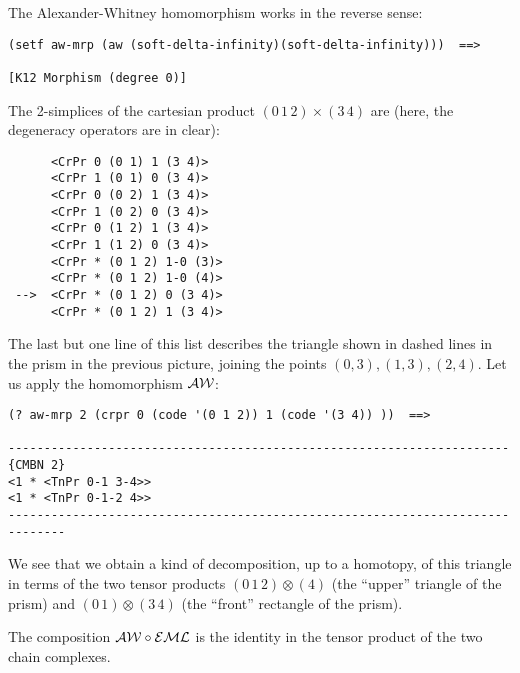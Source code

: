 The Alexander-Whitney homomorphism works in the reverse sense:
{\footnotesize\begin{verbatim}
(setf aw-mrp (aw (soft-delta-infinity)(soft-delta-infinity)))  ==>

[K12 Morphism (degree 0)]
\end{verbatim}}
The 2-simplices of the cartesian product $(0\, 1\, 2) \times (3\, 4)$ are (here, the degeneracy
operators are in clear):
{\footnotesize\begin{verbatim}
      <CrPr 0 (0 1) 1 (3 4)>
      <CrPr 1 (0 1) 0 (3 4)>
      <CrPr 0 (0 2) 1 (3 4)>
      <CrPr 1 (0 2) 0 (3 4)>
      <CrPr 0 (1 2) 1 (3 4)>
      <CrPr 1 (1 2) 0 (3 4)>
      <CrPr * (0 1 2) 1-0 (3)>
      <CrPr * (0 1 2) 1-0 (4)>
 -->  <CrPr * (0 1 2) 0 (3 4)>
      <CrPr * (0 1 2) 1 (3 4)>
\end{verbatim}}
The last but one line of this list describes the triangle shown in dashed lines in the prism
in the previous picture, joining the points $(0,3), (1,3), (2,4)$. 
Let us apply  the homomorphism $\cal AW$:
{\footnotesize\begin{verbatim}
(? aw-mrp 2 (crpr 0 (code '(0 1 2)) 1 (code '(3 4)) ))  ==>

----------------------------------------------------------------------{CMBN 2}
<1 * <TnPr 0-1 3-4>>
<1 * <TnPr 0-1-2 4>>
------------------------------------------------------------------------------
\end{verbatim}}
We see that we obtain  a kind of decomposition, up to a homotopy, of this triangle
in terms of the two tensor products $(0\, 1\, 2) \otimes (4)$ (the ``upper'' triangle of
the prism) and $(0\,1) \otimes (3\, 4)$ (the ``front'' rectangle of the prism).
\par
\medskip
The composition ${\cal AW} \circ {\cal EML}$ is the identity in the tensor product of
the two chain complexes.
